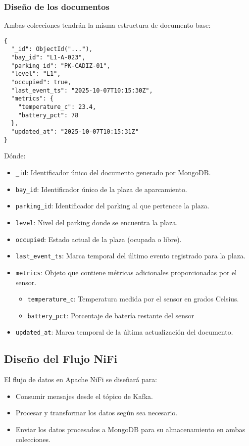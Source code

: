 \documentclass{../../../miPlantilla}
\begin{document}
\newpage

\subsubsection{Diseño de los documentos}
Ambas colecciones tendrán la misma estructura de documento base:
\begin{verbatim}
{
  "_id": ObjectId("..."),
  "bay_id": "L1-A-023",
  "parking_id": "PK-CADIZ-01",
  "level": "L1",
  "occupied": true,
  "last_event_ts": "2025-10-07T10:15:30Z",
  "metrics": {
    "temperature_c": 23.4,
    "battery_pct": 78
  },
  "updated_at": "2025-10-07T10:15:31Z"
}
\end{verbatim}

Dónde:
\begin{itemize}
  \item \texttt{\_id}: Identificador único del documento generado por MongoDB.
  \item \texttt{bay\_id}: Identificador único de la plaza de aparcamiento.
  \item \texttt{parking\_id}: Identificador del parking al que pertenece la plaza.
  \item \texttt{level}: Nivel del parking donde se encuentra la plaza.
  \item \texttt{occupied}: Estado actual de la plaza (ocupada o libre).
  \item \texttt{last\_event\_ts}: Marca temporal del último evento registrado para la plaza.
  \item \texttt{metrics}: Objeto que contiene métricas adicionales proporcionadas por el sensor.
  \begin{itemize}
    \item \texttt{temperature\_c}: Temperatura medida por el sensor en grados Celsius.
    \item \texttt{battery\_pct}: Porcentaje de batería restante del sensor
  \end{itemize} 
  \item \texttt{updated\_at}: Marca temporal de la última actualización del documento.
\end{itemize}

\subsection{Diseño del Flujo NiFi}
El flujo de datos en Apache NiFi se diseñará para:
\begin{itemize}
  \item Consumir mensajes desde el tópico de Kafka.
  \item Procesar y transformar los datos según sea necesario.
  \item Enviar los datos procesados a MongoDB para su almacenamiento en ambas colecciones.
\end{itemize}
\end{document}
